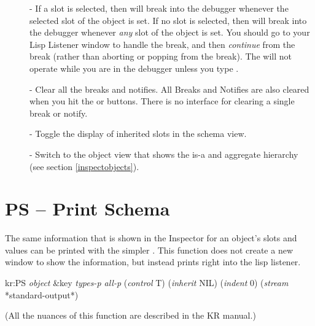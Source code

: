 \begin{description}
\item[]  - If a slot is selected, then will break into the debugger
whenever the selected slot of the object is set.  If no slot is
selected, then will break into the debugger whenever {\it any} slot of
the object is set.  You should go to your Lisp Listener window to
handle the break, and then {\it continue} from the break (rather than
aborting or popping from the break).  The  will not operate
while you are in the debugger unless you type
.

\item[]  - Clear all the breaks and notifies.  All Breaks and
Notifies are also cleared when you hit the  or 
buttons.  There is no interface for clearing a single break or notify.

\item[]  - Toggle the display of inherited slots in the
schema view.

\item[]  - Switch to the object view that shows the is-a and
aggregate hierarchy (see section \ref{inspectobjects}).
\end{description}


\section{PS -- Print Schema}
The same information that is shown in the Inspector for an object's slots and
values can be printed with the simpler .  This function does not
create a new window to show the information, but instead prints right into
the lisp listener.
\begin{programexample}
kr:PS {\it object} \&key {\it types-p  all-p} ({\it control} T) ({\it inherit} NIL) \value{function}
                ({\it indent} 0) ({\it stream} *standard-output*)
\end{programexample}
(All the nuances of this function are described in the KR manual.)

